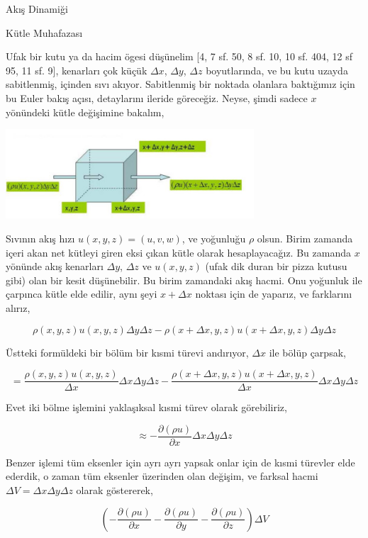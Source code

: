 \documentclass[12pt,fleqn]{article}\usepackage{../../common}
\begin{document}
Akış Dinamiği

Kütle Muhafazası

Ufak bir kutu ya da hacim ögesi düşünelim [4, 7 sf. 50, 8 sf. 10, 10 sf. 404, 12
  sf 95, 11 sf. 9], kenarları çok küçük $\Delta x$, $\Delta y$, $\Delta z$
boyutlarında, ve bu kutu uzayda sabitlenmiş, içinden sıvı akıyor. Sabitlenmiş
bir noktada olanlara baktığımız için bu Euler bakış açısı, detaylarını ileride
göreceğiz. Neyse, şimdi sadece $x$ yönündeki kütle değişimine bakalım,

\includegraphics[width=25em]{phy_050_fluid_02.jpg}

Sıvının akış hızı $u(x,y,z) = (u,v,w)$, ve yoğunluğu $\rho$ olsun. Birim zamanda
içeri akan net kütleyi giren eksi çıkan kütle olarak hesaplayacağız. Bu zamanda
$x$ yönünde akış kenarları $\Delta y$, $\Delta z$ ve $u(x,y,z)$ (ufak dik duran
bir pizza kutusu gibi) olan bir kesit düşünebilir. Bu birim zamandaki akış
hacmi.  Onu yoğunluk ile çarpınca kütle elde edilir, aynı şeyi $x + \Delta x$
noktası için de yaparız, ve farklarını alırız,

$$
\rho(x,y,z)u(x,y,z)\Delta y \Delta z -
\rho(x+\Delta x,y,z) u(x+\Delta x,y,z)\Delta y \Delta z
$$

Üstteki formüldeki bir bölüm bir kısmi türevi andırıyor, $\Delta x$ ile bölüp
çarpsak,

$$
= \frac{\rho(x,y,z)u(x,y,z)}{\Delta x}\Delta x \Delta y \Delta z -
\frac{\rho(x+\Delta x,y,z) u(x+\Delta x,y,z)}{\Delta x} \Delta x \Delta y \Delta z
$$

Evet iki bölme işlemini yaklaşıksal kısmi türev olarak görebiliriz,

$$
\approx -\frac{\partial (\rho u) }{\partial x} \Delta x \Delta y \Delta z
$$

Benzer işlemi tüm eksenler için ayrı ayrı yapsak onlar için de kısmi türevler
elde ederdik, o zaman tüm eksenler üzerinden olan değişim, ve farksal hacmi
$\Delta V = \Delta x \Delta y \Delta z$ olarak göstererek,

$$
\left(
-\frac{\partial (\rho u) }{\partial x} 
-\frac{\partial (\rho u) }{\partial y} 
-\frac{\partial (\rho u) }{\partial z} 
\right) \Delta V
$$
\end{document}
